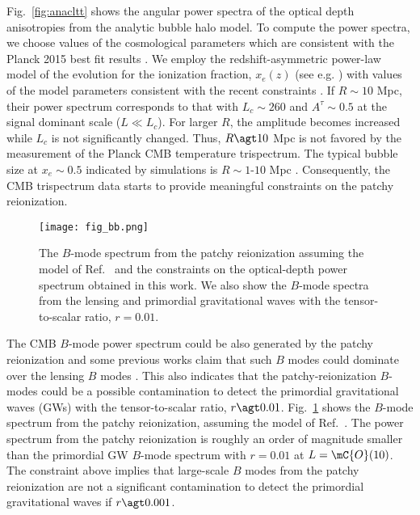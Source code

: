 \documentclass[aps,prd,twocolumn,superscriptaddress,groupedaddress,nofootinbib]{revtex4}
\begin{document}
Fig.~\ref{fig:anacltt} shows the angular power spectra of the optical depth anisotropies 
from the analytic bubble halo model. 
To compute the power spectra, we choose values of the cosmological parameters which are consistent with 
the Planck 2015 best fit results \cite{P15:main}. 
We employ the redshift-asymmetric power-law model of the evolution for the ionization fraction, $x_e(z)$ 
(see e.g. \cite{P16:reion})
with values of the model parameters consistent with the recent constraints \cite{P16:reion}. 
If $R\sim 10$ Mpc, their power spectrum corresponds to that with $L_c\sim 260$ and $A^\tau\sim 0.5$ at 
the signal dominant scale ($L\ll L_c$). 
For larger $R$, the amplitude becomes increased while $L_c$ is not significantly changed. 
Thus, $R\agt 10$ Mpc is not favored by the measurement of the Planck CMB temperature trispectrum. 
The typical bubble size at $x_e\sim 0.5$ indicated by simulations is 
$R\sim 1$-$10$ Mpc \cite{Furlanetto:2006,Zahn:2006b}. 
Consequently, the CMB trispectrum data starts to provide meaningful constraints on the patchy reionization. 

\begin{figure}[t]
\bc
\texttt{[image: fig\_bb.png]} 
\caption{
The $B$-mode spectrum from the patchy reionization assuming the model of Ref.~\cite{Dvorkin:2009ah} 
and the constraints on the optical-depth power spectrum obtained in this work. 
We also show the $B$-mode spectra from the lensing and primordial gravitational waves 
with the tensor-to-scalar ratio, $r=0.01$. 
}
\label{fig:bb}
\ec
\end{figure}

The CMB $B$-mode power spectrum could be also generated by the patchy reionization 
and some previous works claim that such $B$ modes could dominate over the lensing $B$ modes 
\cite{Dore:2007,Dvorkin:2009ah,Mortonson:2010}. 
This also indicates that the patchy-reionization $B$-modes could be a possible contamination to 
detect the primordial gravitational waves (GWs) with the tensor-to-scalar ratio, $r\agt0.01$. 
Fig.~\ref{fig:bb} shows the $B$-mode spectrum from the patchy reionization, 
assuming the model of Ref.~\cite{Dvorkin:2009ah}. 
The power spectrum from the patchy reionization 
is roughly an order of magnitude smaller than the primordial GW $B$-mode spectrum with $r=0.01$ at $L=\mC{O}(10)$. 
The constraint above implies that large-scale $B$ modes from the patchy reionization are not 
a significant contamination to detect the primordial gravitational waves if $r\agt0.001$.
\end{document}
